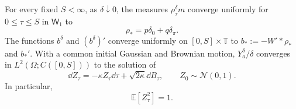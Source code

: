 \documentclass[11pt,reqno]{amsart}
\numberwithin{equation}{section}
\theoremstyle{plain}
\theoremstyle{remark}
\newcommand{\T}{\mathbb T}\newcommand{\R}{\mathbb R}\newcommand{\Z}{\mathbb Z}
\newcommand{\E}{\mathbb E}\newcommand{\Q}{\mathbb Q}\newcommand{\Pb}{\mathbb P}
\begin{document}
\begin{lemma}\label{ce:lem:packet}
For every fixed $S<\infty$, as $\delta\downarrow0$, the measures $\rho^\delta_\tau m$ converge uniformly for $0\le\tau\le S$ in $\mathsf W_1$ to
\begin{equation}\label{ce:eq:atomic}
 \rho_*=p\delta_0+q\delta_\pi.
\end{equation}
The functions $b^\delta$ and $(b^\delta)'$ converge uniformly on $[0,S]\times\T$ to $b_*:=-W'*\rho_*$ and $b_*'$. With a common initial Gaussian and Brownian motion, $Y_a^\delta/\delta$ converges in $L^2(\Omega;C([0,S]))$ to the solution of
\begin{equation}\label{ce:eq:rareOU}
 \dd Z_\tau=-\kappa Z_\tau\dd\tau+\sqrt{2\kappa}\dd B_\tau,
 \qquad Z_0\sim\mathcal N(0,1).
\end{equation}
In particular,
\begin{equation}\label{ce:eq:v}
 \E[Z_\tau^2]=1.
\end{equation}
\end{lemma}
\end{document}
